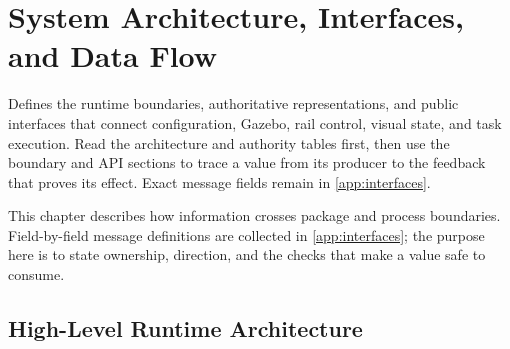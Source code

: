 \chapter{System Architecture, Interfaces, and Data Flow}
\label{ch:interfaces}

\chapteroverview
  {Defines the runtime boundaries, authoritative representations, and public
   interfaces that connect configuration, Gazebo, rail control, visual state,
   and task execution.}
  {Read the architecture and authority tables first, then use the boundary and
   API sections to trace a value from its producer to the feedback that proves
   its effect. Exact message fields remain in \cref{app:interfaces}.}

This chapter describes how information crosses package and process boundaries.
Field-by-field message definitions are collected in \cref{app:interfaces}; the
purpose here is to state ownership, direction, and the checks that make a value
safe to consume.

\section{High-Level Runtime Architecture}

